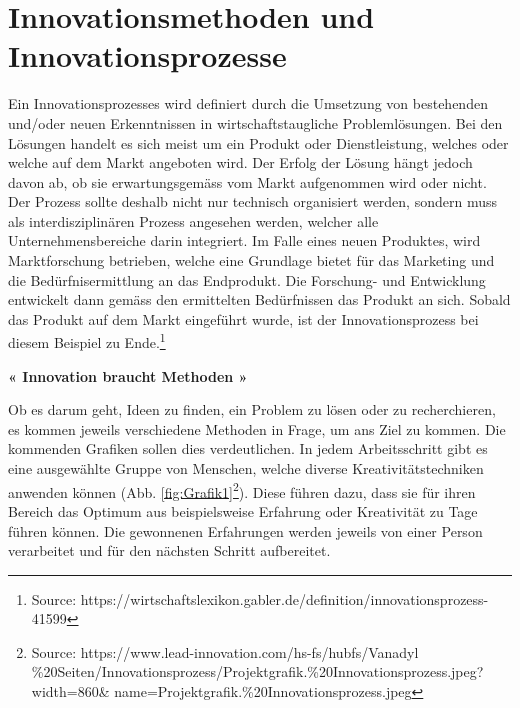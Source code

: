 \section{Innovationsmethoden und Innovationsprozesse}


Ein Innovationsprozesses wird definiert durch die Umsetzung von bestehenden und/oder neuen Erkenntnissen in wirtschaftstaugliche Problemlösungen. Bei den Lösungen handelt es sich meist um ein Produkt oder Dienstleistung, welches oder welche auf dem Markt angeboten wird. Der Erfolg der Lösung hängt jedoch davon ab, ob sie erwartungsgemäss vom Markt aufgenommen wird oder nicht. Der Prozess sollte deshalb nicht nur technisch organisiert werden, sondern muss als interdisziplinären Prozess angesehen werden, welcher alle Unternehmensbereiche darin integriert. Im Falle eines neuen Produktes, wird Marktforschung betrieben, welche eine Grundlage bietet für das Marketing und die Bedürfnisermittlung an das Endprodukt. Die Forschung- und Entwicklung entwickelt dann gemäss den ermittelten Bedürfnissen das Produkt an sich. Sobald das Produkt auf dem Markt eingeführt wurde, ist der Innovationsprozess bei diesem Beispiel zu Ende.\footnote{Source: https://wirtschaftslexikon.gabler.de/definition/innovationsprozess-41599}



\textbf{« Innovation braucht Methoden »}

Ob es darum geht, Ideen zu finden, ein Problem zu lösen oder zu recherchieren, es kommen jeweils verschiedene Methoden in Frage, um ans Ziel zu kommen. Die kommenden Grafiken sollen dies verdeutlichen. In jedem Arbeitsschritt gibt es eine ausgewählte Gruppe von Menschen, welche diverse Kreativitätstechniken anwenden können (Abb. \ref{fig:Grafik1}\footnote{Source: https://www.lead-innovation.com/hs-fs/hubfs/Vanadyl \%20Seiten/Innovationsprozess/Projektgrafik.\%20Innovationsprozess.jpeg?width=860\& name=Projektgrafik.\%20Innovationsprozess.jpeg}). Diese führen dazu, dass sie für ihren Bereich das Optimum aus beispielsweise Erfahrung oder Kreativität zu Tage führen können. Die gewonnenen Erfahrungen werden jeweils von einer Person verarbeitet und für den nächsten Schritt aufbereitet.


